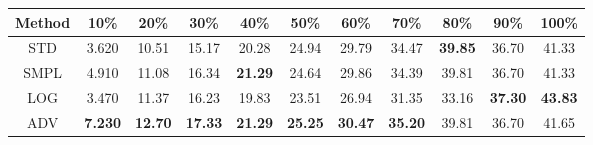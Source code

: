 \documentclass{standalone}
\begin{document}
\begin{tabular}{c|cccccccccc}
      \toprule
      Method & 10\% & 20\% & 30\% & 40\% & 50\% & 60\% & 70\% & 80\% & 90\% & 100\% \\
      \midrule
STD & 3.620 & 10.51 & 15.17 & 20.28 & 24.94 & 29.79 & 34.47 & \textbf{39.85} & 36.70 & 41.33\\
SMPL & 4.910 & 11.08 & 16.34 & \textbf{21.29} & 24.64 & 29.86 & 34.39 & 39.81 & 36.70 & 41.33\\
LOG & 3.470 & 11.37 & 16.23 & 19.83 & 23.51 & 26.94 & 31.35 & 33.16 & \textbf{37.30} & \textbf{43.83}\\
ADV & \textbf{7.230} & \textbf{12.70} & \textbf{17.33} & \textbf{21.29} & \textbf{25.25} & \textbf{30.47} & \textbf{35.20} & 39.81 & 36.70 & 41.65\\
  \bottomrule
\end{tabular}
\end{document}
